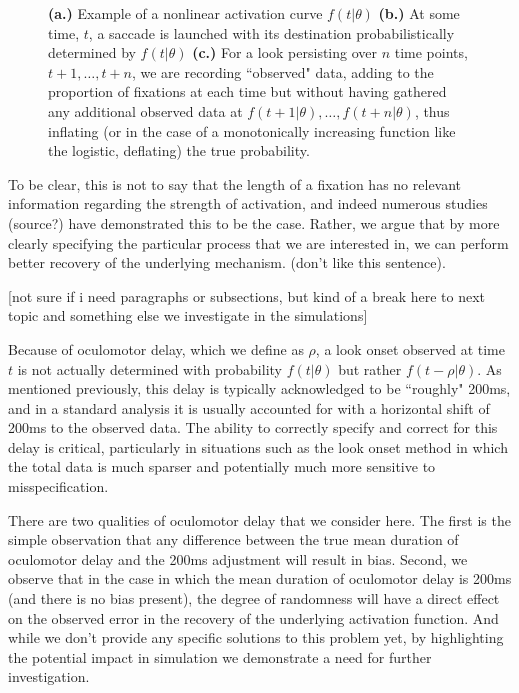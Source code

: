 \begin{figure}[H]
    \centering
    \caption{ \textbf{(a.)} Example of a nonlinear activation curve $f(t|\theta)$ \textbf{(b.)} At some time, $t$, a saccade is launched with its destination probabilistically determined by $f(t|\theta)$ \textbf{(c.)} For a look persisting over $n$ time points, $t+1, \dots, t+n$, we are recording ``observed" data, adding to the proportion of fixations at each time but without having gathered any additional observed data at $f(t+1 | \theta), \dots,f(t+n | \theta)$, thus inflating (or in the case of a monotonically increasing function like the logistic, deflating) the true probability. }
\label{fig:folly_of_fixation}
\end{figure}

To be clear, this is not to say that the length of a fixation has no relevant information regarding the strength of activation, and indeed numerous studies (source?) have demonstrated this to be the case. Rather, we argue that by more clearly specifying the particular process that we are interested in, we can perform better recovery of the underlying mechanism. (don't like this sentence).

[not sure if i need paragraphs or subsections, but kind of a break here to next topic and something else we investigate in the simulations]

Because of oculomotor delay, which we define as $\rho$, a look onset observed at time $t$ is not actually determined with probability $f(t|\theta)$ but rather $f(t - \rho|\theta)$. As mentioned previously, this delay is typically acknowledged to be ``roughly" 200ms, and in a standard analysis it is usually accounted for with a horizontal shift of 200ms to the observed data. The ability to correctly specify and correct for this delay is critical, particularly in situations such as the look onset method in which the total data is much sparser and potentially much more sensitive to misspecification. 

There are two qualities of oculomotor delay that we consider here. The first is the simple observation that any difference between the true mean duration of oculomotor delay and the 200ms adjustment will result in bias. Second, we observe that in the case in which the mean duration of oculomotor delay is 200ms (and there is no bias present), the degree of randomness will have a direct effect on the observed error in the recovery of the underlying activation function. And while we don't provide any specific solutions to this problem yet, by highlighting the potential impact in simulation we demonstrate a need for further investigation.





